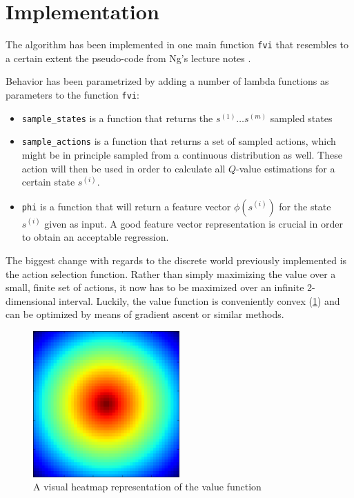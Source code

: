 \documentclass[a4paper, 12pt]{article}
\begin{document}
\section*{Implementation} 
The algorithm has been implemented in one main function \texttt{fvi}
that resembles to a certain extent the pseudo-code
from Ng's lecture notes \cite{ng_lecture}.

Behavior has been parametrized by adding a number of lambda functions
as parameters to the function \texttt{fvi}:

\begin{itemize}
\item \texttt{sample\_states} is a function that returns the $s^{(1)}\ldots s^{(m)}$ sampled states
\item \texttt{sample\_actions} is a function that returns a set of sampled actions, which might be in principle sampled from a continuous distribution as well.
These action will then be used in order to calculate all $Q$-value
estimations for a certain state $s^{(i)}$.
\item \texttt{phi} is a function that will return a feature vector
$\phi(s^{(i)})$ for the state $s^{(i)}$ given as input.
A good feature vector representation is
crucial in order to obtain an acceptable regression.
\end{itemize}

The biggest change with regards to the discrete world previously implemented is
the action selection function. Rather than simply maximizing the value over a
small, finite set of actions, it now has to be maximized over an infinite
2-dimensional interval. Luckily, the value function is conveniently convex
(\ref{fig:V}) and can be optimized by means of gradient ascent or similar
methods.

\begin{figure}[h!]
  \centering
  \includegraphics[width=0.5\textwidth]{V.png}
  \caption{A visual heatmap representation of the value function}
  \label{fig:V}
\end{figure}
\end{document}
